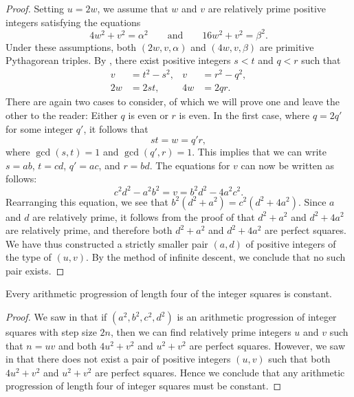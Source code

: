 \begin{proof}
  Setting $u=2w$, we assume that $w$ and $v$ are relatively prime positive integers satisfying the equations
  \begin{equation*}
    4w^2+v^2=\alpha^2\qquad\text{and}\qquad 16w^2+v^2=\beta^2.
  \end{equation*}
  Under these assumptions, both $(2w,v,\alpha)$ and $(4w,v,\beta)$ are primitive Pythagorean triples. By , there exist positive integers $s<t$ and $q<r$ such that
  \begin{align*}
    v & = t^2-s^2, & v & = r^2-q^2, \\
    2w & = 2st, & 4w & = 2qr.
  \end{align*}
  There are again two cases to consider, of which we will prove one and leave the other to the reader: Either $q$ is even or $r$ is even. In the first case, where $q=2q'$ for some integer $q'$, it follows that
  \begin{equation*}
    st=w=q'r,
  \end{equation*}
  where $\gcd(s,t)=1$ and $\gcd(q',r)=1$. This implies that we can write $s=ab$, $t=cd$, $q'=ac$, and $r=bd$. The equations for $v$ can now be written as follows:
  \begin{equation*}
    c^2d^2-a^2b^2=v=b^2d^2-4a^2c^2.
  \end{equation*}
  Rearranging this equation, we see that $b^2(d^2+a^2)=c^2(d^2+4a^2)$. Since $a$ and $d$ are relatively prime, it follows from the proof of  that $d^2+a^2$ and $d^2+4a^2$ are relatively prime, and therefore both $d^2+a^2$ and $d^2+4a^2$ are perfect squares. We have thus constructed a strictly smaller pair $(a,d)$ of positive integers of the type of $(u,v)$. By the method of infinite descent, we conclude that no such pair exists.
\end{proof}

\begin{theorem}
  Every arithmetic progression of length four of the integer squares is constant.
\end{theorem}

\begin{proof}
  We saw in  that if $(a^2,b^2,c^2,d^2)$ is an arithmetic progression of integer squares with step size $2n$, then we can find relatively prime integers $u$ and $v$ such that $n=uv$ and both $4u^2+v^2$ and $u^2+v^2$ are perfect squares. However, we saw in  that there does not exist a pair of positive integers $(u,v)$ such that both $4u^2+v^2$ and $u^2+v^2$ are perfect squares. Hence we conclude that any arithmetic progression of length four of integer squares must be constant.
\end{proof}

